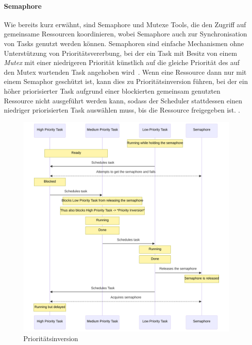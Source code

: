\paragraph{Semaphore}

Wie bereits kurz erwähnt, sind Semaphore und Mutexe Tools, die den Zugriff auf
gemeinsame Ressourcen koordinieren, wobei Semaphore auch zur Synchronisation von
Tasks genutzt werden können. Semaphoren sind einfache Mechanismen ohne
Unterstützung von Prioritätsvererbung, bei der ein Task mit Besitz von einem
\textit{Mutex} mit einer niedrigeren Priorität künstlich auf die gleiche
Priorität des auf den Mutex wartenden Task angehoben
wird~\cite{wikipedia_priority_inheritance}. Wenn eine Ressource dann nur mit
einem Semaphor geschützt ist, kann dies zu Prioritätsinversion führen, bei der
ein höher priorisierter Task aufgrund einer blockierten gemeinsam genutzten
Ressource nicht ausgeführt werden kann, sodass der Scheduler stattdessen einen
niedriger priorisierten Task auswählen muss, bis die Ressource freigegeben ist.
\cite{wikipedia_priority_inversion}.

\begin{figure}[htb]
    \centering
    \includegraphics[width=1\textwidth]{assets/prio_inversion}
    \caption{Prioritätsinversion}
\end{figure}

